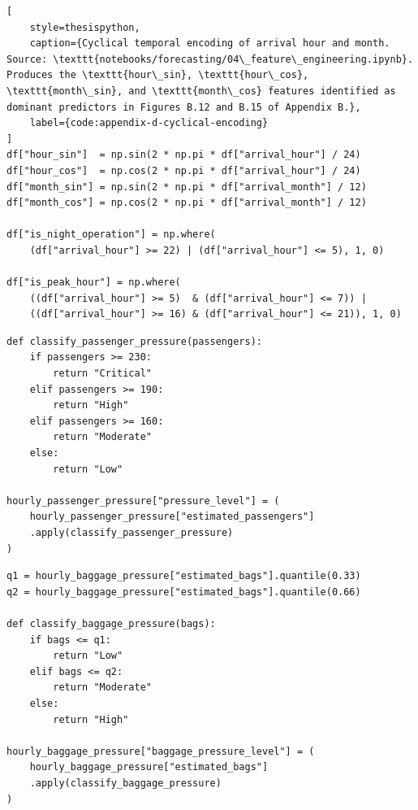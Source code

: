 \begin{lstlisting}[
    style=thesispython,
    caption={Cyclical temporal encoding of arrival hour and month. Source: \texttt{notebooks/forecasting/04\_feature\_engineering.ipynb}. Produces the \texttt{hour\_sin}, \texttt{hour\_cos}, \texttt{month\_sin}, and \texttt{month\_cos} features identified as dominant predictors in Figures B.12 and B.15 of Appendix B.},
    label={code:appendix-d-cyclical-encoding}
]
df["hour_sin"]  = np.sin(2 * np.pi * df["arrival_hour"] / 24)
df["hour_cos"]  = np.cos(2 * np.pi * df["arrival_hour"] / 24)
df["month_sin"] = np.sin(2 * np.pi * df["arrival_month"] / 12)
df["month_cos"] = np.cos(2 * np.pi * df["arrival_month"] / 12)

df["is_night_operation"] = np.where(
    (df["arrival_hour"] >= 22) | (df["arrival_hour"] <= 5), 1, 0)

df["is_peak_hour"] = np.where(
    ((df["arrival_hour"] >= 5)  & (df["arrival_hour"] <= 7)) |
    ((df["arrival_hour"] >= 16) & (df["arrival_hour"] <= 21)), 1, 0)
\end{lstlisting}

\begin{lstlisting}[style=thesispython, caption={Passenger-pressure classification. Source: \texttt{notebooks/analytics/03\_passenger\_pressure\_analysis.ipynb}. Implements the fixed four-band rule of \Cref{tab:appendix-c-pressure-rules} and produces the classification shown in Chapter 5, Figure 5.1, and, in fully annotated form, in \Cref{fig:appendix-b-passenger-pressure-timeline}.}, label={code:appendix-d-passenger-pressure-classification}]
def classify_passenger_pressure(passengers):
    if passengers >= 230:
        return "Critical"
    elif passengers >= 190:
        return "High"
    elif passengers >= 160:
        return "Moderate"
    else:
        return "Low"

hourly_passenger_pressure["pressure_level"] = (
    hourly_passenger_pressure["estimated_passengers"]
    .apply(classify_passenger_pressure)
)
\end{lstlisting}

\begin{lstlisting}[style=thesispython, caption={Baggage-pressure classification. Source: \texttt{notebooks/analytics/03\_passenger\_pressure\_analysis.ipynb}. Implements the percentile-based three-band rule of \Cref{tab:appendix-c-pressure-rules}, in contrast to the fixed thresholds used for passenger pressure, and produces the classification shown, in fully annotated form, in \Cref{fig:appendix-b-baggage-pressure-timeline}.}, label={code:appendix-d-baggage-pressure-classification}]
q1 = hourly_baggage_pressure["estimated_bags"].quantile(0.33)
q2 = hourly_baggage_pressure["estimated_bags"].quantile(0.66)

def classify_baggage_pressure(bags):
    if bags <= q1:
        return "Low"
    elif bags <= q2:
        return "Moderate"
    else:
        return "High"

hourly_baggage_pressure["baggage_pressure_level"] = (
    hourly_baggage_pressure["estimated_bags"]
    .apply(classify_baggage_pressure)
)
\end{lstlisting}

